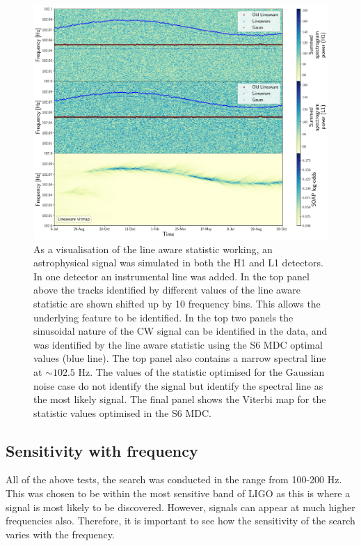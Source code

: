 \begin{figure}
    \centering
    \includegraphics[width=0.9\linewidth]{C3_soap/line_example.pdf}
    \caption[Example of improvements when using optimised parameters for line aware statistic.]{As a visualisation of the line aware statistic working, an astrophysical signal was simulated in both the H1 and L1 detectors. In one detector an instrumental line was added. In the top panel above the tracks identified by different values of the line aware statistic are shown shifted up by 10 frequency bins. This allows the underlying feature to be identified. In the top two panels the sinusoidal nature of the \gls{CW} signal can be identified in the data, and was identified by the line aware statistic using the S6 MDC optimal values (blue line). The top panel also contains a narrow spectral line at $\sim 102.5$ Hz. The values of the statistic optimised for the Gaussian noise case do not identify the signal but identify the spectral line as the most likely signal. The final panel shows the Viterbi map for the statistic values optimised in the S6 MDC. }
    \label{soap:las:optimisation:vitexample}
\end{figure}

\subsection{\label{soap:sensfreq}Sensitivity with frequency}

All of the above tests, the search was conducted in the range from 100-200 Hz.
This was chosen to be within the most sensitive band of \gls{LIGO} as this is where a signal is most likely to be discovered.
However, signals can appear at much higher frequencies also.
Therefore, it is important to see how the sensitivity of the search varies with the frequency.
 
